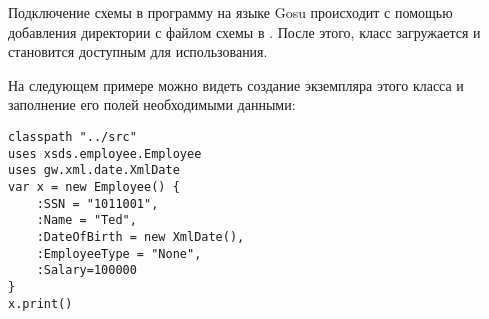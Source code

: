 Подключение схемы в программу на языке Gosu происходит с помощью добавления директории с файлом схемы в .
После этого, класс  загружается и становится доступным для использования.

На следующем примере можно видеть создание экземпляра этого класса и заполнение его полей необходимыми данными:

\begin{lstlisting}[caption={Содержимое файла \texttt{test\_project.gsp} из примера~\ref{gosu-project-layout}.}, label=gosu-xsd-loader]
classpath "../src"
uses xsds.employee.Employee
uses gw.xml.date.XmlDate
var x = new Employee() { 
    :SSN = "1011001", 
    :Name = "Ted", 
    :DateOfBirth = new XmlDate(), 
    :EmployeeType = "None", 
    :Salary=100000 
}
x.print()
\end{lstlisting}




